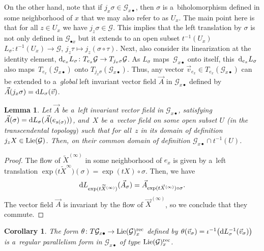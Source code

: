 \documentclass[pdftex]{sigma}
\numberwithin{equation}{section}
\newtheorem{Corollary}[Theorem]{Corollary}
\newtheorem{Lemma}[Theorem]{Lemma}
\theoremstyle{definition}
\begin{document}
On the other hand, note that if $j_x\sigma \in \mathcal G_{x\bullet}$, then $\sigma$ is a~biholomorphism defined in some neighborhood of $x$ that we may also refer to as $U_x$. The main point here is that for all $z\in U_x$ we have $j_z\sigma \in \mathcal G$. This implies that the left translation by $\sigma$ is not only defined in $\mathcal G_{\bullet x}$ but it extends to an open subset $t^{-1}(U_x)$
$L_\sigma \colon t^{-1}(U_x) \to \mathcal G$, $ j_z\tau \mapsto j_z(\sigma \circ \tau)$.
Next, also consider its linearization at the identity element,
${\rm d}_{e_x}L_{\sigma} \colon T_{e_x} \mathcal G \to T_{j_x\sigma} \mathcal G$.
As $L_\sigma$ maps~$\mathcal G_{x\bullet}$ onto itself, this~${\rm d}_{e_x}L_{\sigma}$ also maps~$T_{e_x}(\mathcal G_{x\bullet})$ onto $T_{j_x\sigma}(\mathcal G_{x\bullet})$. Thus, any vector ${\vec v_{e_x} \in T_{e_x}(\mathcal G_{x\bullet})}$ can be extended to a~\emph{global} left invariant vector field $\vec A$ in $\mathcal G_{x\bullet}$ defined by $\vec A(j_x\sigma) = {\rm d}L_{\sigma}(\vec v)$.

\begin{Lemma}
Let $\vec A$ be a~left invariant vector field in $\mathcal G_{x\bullet}$, satisfying $\vec A(\sigma) = {\rm d}L_{\sigma}(\vec A(e_{s(\sigma)}))$, and~$X$ be a~vector field on some open subset $U$ {\rm(}in the transcendental topology$)$ such that for all~$z$ in its domain of definition $j_zX \in {\rm Lie}(\mathcal G)$. Then,
on their common domain of definition $\mathcal G_{x\bullet}\cap t^{-1}(U)$.
\end{Lemma}

\begin{proof}
The flow of $\widetilde X^{(\infty)}$ in some neighborhood of $e_x$ is given by a~left translation
$\exp\bigl(t\widetilde X^{\infty}\bigr)(\sigma) \allowbreak= \exp(t X)\circ \sigma$.
Then, we have
\[{\rm d} L_{\exp(t\widetilde X^{(\infty)})}(\vec A_{\sigma}) = \vec A_{\exp(t\vec X^{(\infty)})\circ \sigma}.\]
The vector field $\vec A$ is invariant by the flow of $\vec X^{(\infty)}$, so we conclude that they commute.
\end{proof}

\begin{Corollary}
The form $\theta \colon T\mathcal G_{x\bullet} \to {\rm Lie}(\mathcal G)_{x}^{\rm rec}$ defined by
$\theta(\vec v_{\sigma}) = \iota^{-1}\bigl({\rm d}L_{\sigma}^{-1}(\vec v_\sigma)\bigr)$ is a~regular parallelism form in $\mathcal G_{x\bullet}$ of type ${\rm Lie}(\mathcal G)_{x}^{\rm rec}$.
\end{Corollary}
\end{document}
